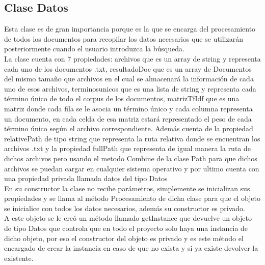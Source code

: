 \documentclass{article}
\begin{document}
\subsection{Clase Datos}
Esta clase es de gran importancia porque es la que se encarga del procesamiento de todos los documentos para recopilar
los datos necesarios que se utilizarán posteriormente cuando el usuario introduzca la búsqueda.\\
La clase cuenta con 7 propiedades: archivos que es un array de string y representa cada uno de los documentos .txt,
resultadoDoc que es un array de Documentos del mismo tamaño que archivos en el cual se almacenará la información
de cada uno de esos archivos, terminosunicos que es una lista de string y representa cada término único de todo el corpus de los 
documentos, matrizTfIdf que es una matriz donde cada fila se le asocia un término único 
y cada columna representa un documento, en cada celda de esa matriz estará representado el peso de cada término único según 
el archivo correspondiente. Además cuenta de la propiedad relativePath de tipo string que representa la ruta relativa donde se encuentran los 
archivos .txt y la propiedad fullPath que representa de igual manera la ruta de dichos archivos pero usando el metodo Combine
de la clase Path para que dichos archivos se puedan cargar en cualquier sistema operativo y por ultimo cuenta con una propiedad privada
llamada datos del tipo Datos\\
En su constructor la clase no recibe parámetros, simplemente se inicializan sus propiedades y se llama al método Procesamiento de dicha clase
para que el objeto se inicialice con todos los datos necesarios, además su constructor es privado.\\
A este objeto se le creó un método llamado getInstance que devuelve un objeto de tipo Datos que controla que en todo el proyecto solo haya una instancia de dicho objeto, por eso
el constructor del objeto es privado y es este método el encargado de crear la instancia en caso de que no exista y si ya existe devolver la existente.  
\end{document}
